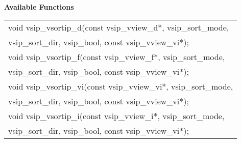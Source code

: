 \\\cvsiplh
\newline \hspace*{.8cm} \vspace*{.1cm} \textbf{Available Functions }
\newline \hspace*{1.1cm} {
\ttfamily
\begin{tabular}[H]{l}
void vsip\_vsortip\_d(const vsip\_vview\_d*, vsip\_sort\_mode,\\*\hspace*{1cm}vsip\_sort\_dir, vsip\_bool, const vsip\_vview\_vi*);\\
void vsip\_vsortip\_f(const vsip\_vview\_f*, vsip\_sort\_mode,\\*\hspace*{1cm}vsip\_sort\_dir, vsip\_bool, const vsip\_vview\_vi*);\\
void vsip\_vsortip\_vi(const vsip\_vview\_vi*, vsip\_sort\_mode,\\*\hspace*{1cm}vsip\_sort\_dir, vsip\_bool, const vsip\_vview\_vi*);\\
void vsip\_vsortip\_i(const vsip\_vview\_i*, vsip\_sort\_mode,\\*\hspace*{1cm}vsip\_sort\_dir, vsip\_bool, const vsip\_vview\_vi*);\\
\end{tabular}
}\\
\\\pyjvsiph
{}
